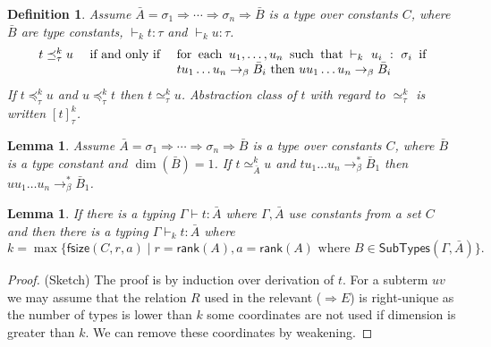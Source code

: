 \documentclass[10pt,a4paper]{article}
\theoremstyle{plain}%
\newtheorem{definition}[theorem]{Definition}
\newtheorem{lemma}[theorem]{Lemma}
\begin{document}
\newcommand{\fsize}{\mathsf{fsize}\xspace}
\newcommand{\rank}{\mathsf{rank}\xspace}
\newcommand{\arity}{\mathsf{rank}\xspace}
\newcommand{\Types}{\mathsf{SubTypes}\xspace}


\begin{definition}
  Assume
  $\bar{A} =
  \sigma_1\Rightarrow\cdots\Rightarrow\sigma_n\Rightarrow\bar{B}$ is a
  type over constants $C$, where $\bar{B}$ are type constants,
  $\vdash_k t :\tau$ and $\vdash_k u :\tau$.
  \begin{displaymath}
    \begin{array}{lcp{200pt}}
      t \preceq^k_{\tau} u &  \mbox{ if and only if } &
    for each $u_1,\ldots,u_n$ such that $\vdash_k u_i:\sigma_i$ if
    $tu_1\ldots u_n\to_\beta \bar{B}_i$ then $uu_1\ldots u_n\to_\beta \bar{B}_i$
    \end{array}
  \end{displaymath}
  If $t \preceq^k_{\tau} u$ and $u \preceq^k_{\tau} t$ then $t \simeq^k_{\tau} u$.
  Abstraction class of $t$ with regard to $\simeq^k_{\tau}$ is written $[t]^k_\tau$.
\end{definition}


\begin{lemma}
  Assume
  $\bar{A} =
  \sigma_1\Rightarrow\cdots\Rightarrow\sigma_n\Rightarrow\bar{B}$ is a
  type over constants $C$, where $\bar{B}$ is a type constant and
  $\dim(\bar{B})=1$.  If $t\simeq^k_{\bar{A}} u$ and
  $tu_1\ldots u_n\to^*_\beta \bar{B}_1$ then
  $uu_1\ldots u_n\to^*_\beta \bar{B}_1$.
\end{lemma}

\begin{lemma}
  If there is a typing $\Gamma\vdash t:\bar{A}$ where $\Gamma,\bar{A}$
  use constants from a set $C$ and
  then there is a typing
  $\Gamma\vdash_k t:\bar{A}$ where
  $$
  k=\max\{ \fsize(C,r,a) \mid r = \rank(A), a=\arity(A)
    \mbox{ where } B\in\Types(\Gamma,\bar{A}) \}.
  $$
\end{lemma}
\begin{proof} (Sketch)
  The proof is by induction over derivation of $t$. For a subterm $uv$
  we may assume that the relation $R$ used in the relevant ($\Rightarrow E$)
  is right-unique as the number of types is lower than $k$ some coordinates
  are not used if dimension is greater than $k$. We can remove these coordinates
  by weakening.
\end{proof}
\end{document}
